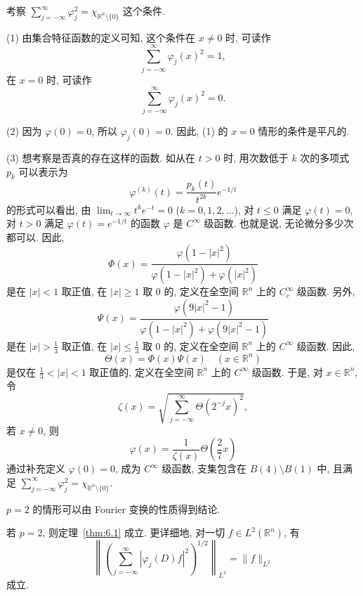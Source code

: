 \begin{note}\label{note:6.1}
考察 $\sum_{j=-\infty}^{\infty}\varphi_{j}^{2} = \chi_{\mathbb{R}^{n}\setminus\{0\}}$ 这个条件.

(1) 由集合特征函数的定义可知, 这个条件在 $x \neq 0$ 时, 可读作
\[
\sum_{j=-\infty}^{\infty}\varphi_{j}(x)^{2} = 1,
\]
在 $x = 0$ 时, 可读作
\[
\sum_{j=-\infty}^{\infty}\varphi_{j}(x)^{2} = 0.
\]

(2) 因为 $\varphi(0) = 0$, 所以 $\varphi_{j}(0) = 0$. 因此, (1) 的 $x = 0$ 情形的条件是平凡的.

(3) 想考察是否真的存在这样的函数. 如从在 $t > 0$ 时, 用次数低于 $k$ 次的多项式 $p_{k}$ 可以表示为
\begin{equation}\tag{6.1}
\varphi^{(k)}(t) = \frac{p_{k}(t)}{t^{2k}}e^{-1/t}
\label{eq:6.1}
\end{equation}
的形式可以看出, 由 $\lim_{t \to \infty}t^{k}e^{-t} = 0$ ($k = 0, 1, 2, \ldots$), 对 $t \leq 0$ 满足 $\varphi(t) = 0$, 对 $t > 0$ 满足 $\varphi(t) = e^{-1/t}$ 的函数 $\varphi$ 是 $C^{\infty}$ 级函数. 也就是说, 无论微分多少次都可以. 因此,
\[
\Phi(x) = \frac{\varphi(1 - |x|^{2})}{\varphi(1 - |x|^{2}) + \varphi(|x|^{2})}
\]
是在 $|x| < 1$ 取正值, 在 $|x| \geq 1$ 取 $0$ 的, 定义在全空间 $\mathbb{R}^{n}$ 上的 $C_{c}^{\infty}$ 级函数. 另外,
\[
\Psi(x) = \frac{\varphi(9|x|^{2} - 1)}{\varphi(1 - |x|^{2}) + \varphi(9|x|^{2} - 1)}
\]
是在 $|x| > \frac{1}{3}$ 取正值, 在 $|x| \leq \frac{1}{3}$ 取 $0$ 的, 定义在全空间 $\mathbb{R}^{n}$ 上的 $C^{\infty}$ 级函数. 因此,
\[
\Theta(x) = \Phi(x)\Psi(x) \quad (x \in \mathbb{R}^{n})
\]
是仅在 $\frac{1}{3} < |x| < 1$ 取正值的, 定义在全空间 $\mathbb{R}^{n}$ 上的 $C^{\infty}$ 级函数. 于是, 对 $x \in \mathbb{R}^{n}$, 令
\[
\zeta(x) = \sqrt{\sum_{j=-\infty}^{\infty}\Theta(2^{-j}x)^{2}},
\]
若 $x \neq 0$, 则
\[
\varphi(x) = \frac{1}{\zeta(x)}\Theta\left(\frac{2}{7}x\right)
\]
通过补充定义 $\varphi(0) = 0$, 成为 $C^{\infty}$ 级函数, 支集包含在 $B(4) \setminus B(1)$ 中, 且满足 $\sum_{j=-\infty}^{\infty}\varphi_{j}^{2} = \chi_{\mathbb{R}^{n}\setminus\{0\}}$.
\end{note}

$p = 2$ 的情形可以由 Fourier 变换的性质得到结论.

\begin{lemma}\label{lem:6.1}
若 $p = 2$, 则定理~\ref{thm:6.1} 成立. 更详细地, 对一切 $f \in L^{2}(\mathbb{R}^{n})$, 有
\begin{equation}\tag{6.2}
\left\|\left(\sum_{j=-\infty}^{\infty}|\varphi_{j}(D)f|^{2}\right)^{1/2}\right\|_{L^{2}} = \|f\|_{L^{2}}
\label{eq:6.2}
\end{equation}
成立.
\end{lemma}

